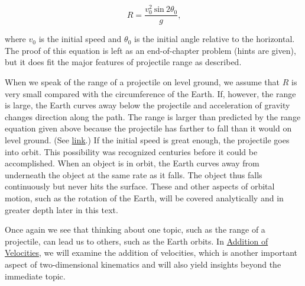 \documentclass[
]{book}
\begin{document}
\leavevmode{}%
\[{R = \frac{v_{0}^{2}\ \text{sin}\ {2\theta}_{0}}{g}}\text{,}{}\]

where \(v_{0}{}\) is the initial speed and \(\theta_{0}{}\) is the initial
angle relative to the horizontal. The proof of this equation is left as
an end-of-chapter problem (hints are given), but it does fit the major
features of projectile range as described.

When we speak of the range of a projectile on level ground, we assume
that \(R{}\) is very small compared with the circumference of the Earth.
If, however, the range is large, the Earth curves away below the
projectile and acceleration of gravity changes direction along the path.
The range is larger than predicted by the range equation given above
because the projectile has farther to fall than it would on level
ground. (See \protect\hyperlink{import-auto-id1645881}{link}.) If
the initial speed is great enough, the projectile goes into orbit. This
possibility was recognized centuries before it could be accomplished.
When an object is in orbit, the Earth curves away from underneath the
object at the same rate as it falls. The object thus falls continuously
but never hits the surface. These and other aspects of orbital motion,
such as the rotation of the Earth, will be covered analytically and in
greater depth later in this text.

Once again we see that thinking about one topic, such as the range of a
projectile, can lead us to others, such as the Earth orbits. In
\href{/m55089}{Addition of Velocities}, we will examine the addition of
velocities, which is another important aspect of two-dimensional
kinematics and will also yield insights beyond the immediate topic.
\end{document}
